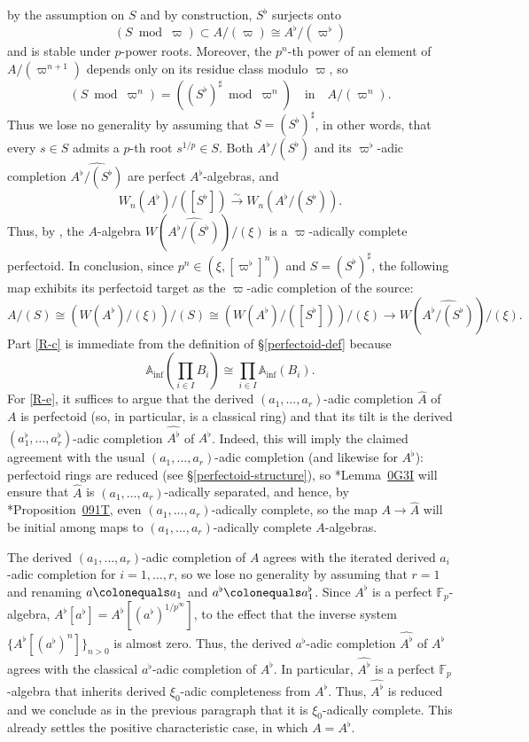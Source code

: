 \documentclass[11pt, reqno]{amsart}
\newcommand{\bA}{\mathbb{A}}
\newcommand{\bF}{\mathbb{F}}
\newcommand{\ce}{\colonequals}
\newcommand{\Inf}{\mathrm{inf}}		%
\newcommand{\isomto}{\overset{\sim}{\longrightarrow}}
\newcommand{\ra}{\rightarrow}
\newcommand{\wh}{\widehat}
\providecommand{\qxq}[1]{\quad\text{#1}\quad}
\newcommand{\tst}{\textstyle}
\numberwithin{equation}{numberingbase}
\theoremstyle{thms}
\theoremstyle{claims}
\theoremstyle{defs}
\theoremstyle{thms}
\theoremstyle{defs}
\theoremstyle{subsection-tweak}
\theoremstyle{subsection-tweak}
\begin{document}
by the assumption on $S$ and by construction, $S^\flat$ surjects onto 
\[
(S \bmod \varpi) \subset A/(\varpi) \cong A^\flat/(\varpi^\flat)
\]
and is stable under $p$-power roots. Moreover, the $p^n$-th power of an element of $A/(\varpi^{n + 1})$ depends only on its residue class modulo $\varpi$, so %
\[
(S \bmod \varpi^n) = ((S^\flat)^\sharp \bmod \varpi^n) \qxq{in} A/(\varpi^n).
\]
Thus we lose no generality by assuming that $S = (S^\flat)^\sharp$, in other words, that every $s \in S$ admits a $p$-th root $s^{1/p} \in S$. Both $A^\flat/(S^\flat)$ and its $\varpi^\flat$-adic completion $\wh{A^\flat/(S^\flat)}$ are perfect $A^\flat$-algebras, and 
\[
W_n(A^\flat)/([S^\flat]) \isomto W_n(A^\flat/(S^\flat)).
\]
Thus, by , the $A$-algebra $W(\wh{A^\flat/(S^\flat)})/(\xi)$ is a $\varpi$-adically complete perfectoid. In conclusion, since $p^n \in (\xi, [\varpi^\flat]^n)$ and $S = (S^\flat)^\sharp$, the following map exhibits its perfectoid target as the $\varpi$-adic completion of the source:
\[%
A/(S) \cong (W(A^\flat)/(\xi))/(S) \cong (W(A^\flat)/([S^\flat]))/(\xi) 
\ra W(\wh{A^\flat/(S^\flat)})/(\xi).
\]%
Part \ref{R-c} is immediate from the definition of \S\ref{perfectoid-def} because 
\[
\tst\bA_\Inf(\prod_{i \in I} B_i) \cong \prod_{i \in I} \bA_\Inf(B_i).
\] 
For \ref{R-e}, it suffices to argue that the derived $(a_1, \dotsc, a_r)$-adic completion $\wh{A}$ of $A$ is perfectoid (so, in particular, is a classical ring) and that its tilt is the derived $(a_1^\flat, \dotsc, a_r^\flat)$-adic completion $\wh{A^\flat}$ of $A^\flat$. Indeed, this will imply the claimed agreement with the usual $(a_1, \dotsc, a_r)$-adic completion (and likewise for $A^\flat$): perfectoid rings are reduced (see \S\ref{perfectoid-structure}), so \cite{SP}*{Lemma~\href{https://stacks.math.columbia.edu/tag/0G3I}{0G3I}} will ensure that $\wh{A}$ is $(a_1, \dotsc, a_r)$-adically separated, and hence, by \cite{SP}*{Proposition~\href{https://stacks.math.columbia.edu/tag/091T}{091T}}, even $(a_1, \dotsc, a_r)$-adically complete, so the map $A \ra \wh{A}$ will be initial among maps to $(a_1, \dotsc, a_r)$-adically complete $A$-algebras. 

The derived $(a_1, \dotsc, a_r)$-adic completion of $A$ agrees with the iterated derived $a_i$-adic completion for $i = 1, \dotsc, r$, so we lose no generality by assuming that $r = 1$ and renaming $a \ce a_1$ and $a^\flat \ce a_1^\flat$. Since $A^\flat$ is a perfect $\bF_p$-algebra, $A^\flat[a^\flat] = A^\flat[(a^\flat)^{1/p^\infty}]$, to the effect that the inverse system $\{ A^\flat[(a^\flat)^n]\}_{n > 0}$ is almost zero. Thus, the derived $a^\flat$-adic completion $\wh{A^\flat}$ of $A^\flat$ agrees with the classical $a^\flat$-adic completion of $A^\flat$. In particular, $\wh{A^\flat}$ is a perfect $\bF_p$-algebra that inherits derived $\xi_0$-adic completeness from $A^\flat$. Thus, $\wh{A^\flat}$ is reduced and we conclude as in the previous paragraph that it is $\xi_0$-adically complete. This already settles the positive characteristic case, in which $A = A^\flat$.
\end{document}
